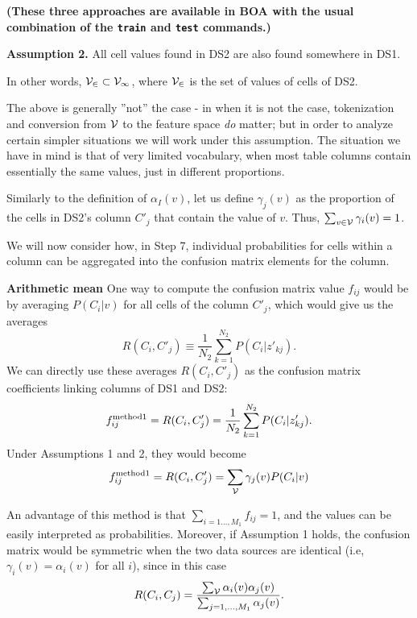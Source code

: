 \documentclass[12pt]{article}
\begin{document}
{\bf (These three approaches are available in BOA with the usual combination of the  {\tt train} and  {\tt test} commands.)}

{\bf Assumption 2.} All cell values found in DS2 are also found somewhere in DS1. 

In other words, $\cal{V}_2 \subset \cal{V}_1$, where $\cal{V}_2$ is
the set of values of cells of DS2.

The above is generally ''not'' the case - in when it is not the case,
tokenization and conversion from $\cal{V}$ to the feature space {\em
  do} matter; but in order to analyze certain simpler situations we
will work under this assumption. The situation we have in mind is that
of very limited vocabulary, when most table columns contain
essentially the same values, just in different proportions.

Similarly to the definition of $\alpha_I(v)$, let us define
$\gamma_j(v)$ as the proportion of the cells in DS2's column $C'_j$
that contain the value of $v$. Thus,  $\sum_{v\in \cal{V}} \gamma_i(v)=1$.

We will now consider how, in Step 7, individual probabilities for
cells within a column can be aggregated into the confusion matrix
elements for the column.

{\bf Arithmetic mean}
One way to compute the confusion matrix value $f_{ij}$ would be by averaging $P(C_i|v)$ for all cells of the column $C'_j$, which would give us the averages
\begin{equation}
\label{eq:R-def1}
R(C_i,C'_j) \equiv  \frac{1}{N_2} \sum_{k=1}^{N_2} P(C_i|z'_{kj}).
\end{equation}
We can directly use these averages $R(C_i,C'_j)$ as the confusion matrix coefficients  linking columns of DS1 and DS2:
\begin{equation}
\label{eq:ag-ar}
f_{ij}^{\rm method 1} = R(C_i,C'_j)  =  \frac{1}{N_2} \sum_{k=1}^{N_2} P(C_i|z'_{kj}).
\end{equation}
Under Assumptions 1 and 2, they would become 
\begin{equation}
\label{eq:ag-ar2}
f_{ij}^{\rm method 1} = R(C_i,C'_j)  = \sum_{\cal{V}} \gamma_j(v) P(C_i|v) 
\end{equation}

An advantage of this method is that $\sum_{i=1\ldots,M_1} f_{ij} = 1$, and the values can be easily interpreted as probabilities. Moreover, if Assumption 1 holds, the confusion matrix would be symmetric when the two data sources are identical (i.e, $\gamma_i(v)=\alpha_i(v)$ for all $i$), since in this case 
$$
R(C_i,C_j) =\frac{\sum_{\cal{V}} \alpha_i(v)  \alpha_j(v)}{\sum_{j=1,\ldots,M_1} \alpha_j(v)}.
$$
\end{document}
